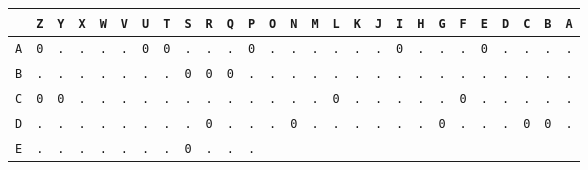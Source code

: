 \begin{figure}[H]
	\begin{center}
		\scalebox{0.5} {
			\begin{tabular}{c|cccccccccccccccccccccccccc}
				           & \texttt{Z} & \texttt{Y} & \texttt{X} & \texttt{W} &
				\texttt{V} & \texttt{U} & \texttt{T} & \texttt{S} &
				\texttt{R} & \texttt{Q} & \texttt{P} & \texttt{O} &
				\texttt{N} & \texttt{M} & \texttt{L} & \texttt{K} &
				\texttt{J} & \texttt{I} & \texttt{H} & \texttt{G} &
				\texttt{F} & \texttt{E} & \texttt{D} & \texttt{C} &
				\texttt{B} & \texttt{A}                                          \\ \hline
				\texttt{A} & \texttt{0} & \texttt{.} & \texttt{.} &
				\texttt{.} & \texttt{.} & \texttt{0} & \texttt{0} &
				\texttt{.} & \texttt{.} & \texttt{.} & \texttt{0} &
				\texttt{.} & \texttt{.} & \texttt{.} & \texttt{.} &
				\texttt{.} & \texttt{.} & \texttt{0} & \texttt{.} &
				\texttt{.} & \texttt{.} & \texttt{0} & \texttt{.} &
				\texttt{.} & \texttt{.} & \texttt{.}                             \\
				\texttt{B} & \texttt{.} & \texttt{.} & \texttt{.} &
				\texttt{.} & \texttt{.} & \texttt{.} & \texttt{.} &
				\texttt{0} & \texttt{0} & \texttt{0} & \texttt{.} &
				\texttt{.} & \texttt{.} & \texttt{.} & \texttt{.} &
				\texttt{.} & \texttt{.} & \texttt{.} & \texttt{.} &
				\texttt{.} & \texttt{.} & \texttt{.} & \texttt{.} &
				\texttt{.} & \texttt{.} & \texttt{.}                             \\
				\texttt{C} & \texttt{0} & \texttt{0} & \texttt{.} &
				\texttt{.} & \texttt{.} & \texttt{.} & \texttt{.} &
				\texttt{.} & \texttt{.} & \texttt{.} & \texttt{.} &
				\texttt{.} & \texttt{.} & \texttt{.} & \texttt{0} &
				\texttt{.} & \texttt{.} & \texttt{.} & \texttt{.} &
				\texttt{.} & \texttt{0} & \texttt{.} & \texttt{.} &
				\texttt{.} & \texttt{.} & \texttt{.}                             \\
				\texttt{D} & \texttt{.} & \texttt{.} & \texttt{.} &
				\texttt{.} & \texttt{.} & \texttt{.} & \texttt{.} &
				\texttt{.} & \texttt{0} & \texttt{.} & \texttt{.} &
				\texttt{.} & \texttt{0} & \texttt{.} & \texttt{.} &
				\texttt{.} & \texttt{.} & \texttt{.} & \texttt{.} &
				\texttt{0} & \texttt{.} & \texttt{.} & \texttt{.} &
				\texttt{0} & \texttt{0} & \texttt{.}                             \\
				\texttt{E} & \texttt{.} & \texttt{.} & \texttt{.} &
				\texttt{.} & \texttt{.} & \texttt{.} & \texttt{.} &
				\texttt{0} & \texttt{.} & \texttt{.} & \texttt{.} &

\end{tabular}}
\end{center}
\end{figure}
